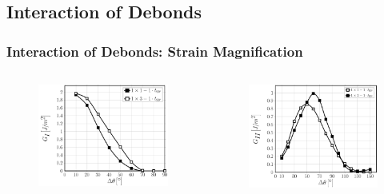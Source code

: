 \documentclass[first,firstsupp,lastsupp,last,hyperref,table]{ETHclass}
\begin{document}

\subsection{Interaction of Debonds}

\begin{frame}
\frametitle{\vspace{0.2cm}\small Interaction of Debonds: Strain Magnification}
\vspace{-.75cm}
\centering
\begin{columns}[c]
\centering
\begin{column}{0.5\textwidth}
\centering
\begin{figure}
\centering
\includegraphics[width=\columnwidth]{nxk-1-vf60-GI-strainmagni1.pdf}
\end{figure}
\end{column}
\begin{column}{0.5\textwidth}
\centering
\begin{figure}
\centering
\includegraphics[width=\columnwidth]{nxk-1-vf60-GII-strainmagni1.pdf}

\end{figure}
\end{column}
\end{columns}
\end{frame}
\end{document}
